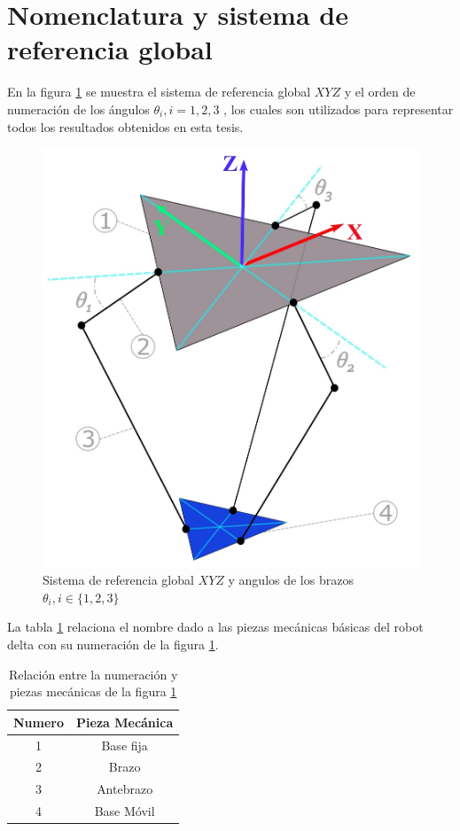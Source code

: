          \newpage


\section{Nomenclatura y sistema de referencia global}
    En la figura \ref{f:ref1} se muestra el sistema de referencia global $XYZ$ y el orden de numeración de los ángulos $\theta_i , i=1,2,3$ , los cuales son utilizados para representar todos los resultados obtenidos en esta tesis. 
    
        \begin{figure}[htb]
             \centering
             \includegraphics[width=0.73\linewidth]{Main/Chapter4/Images4/DIBUJO1.jpg}
              \caption{Sistema de referencia global $XYZ$ y angulos de los brazos $\theta_i , i\in \{1,2,3\}$ }
              \label{f:ref1}
        \end{figure}

La tabla \ref{tab:cap4_tabla_00} relaciona el nombre dado a las piezas mecánicas básicas del robot delta con su numeración de la figura \ref{f:ref1}.
        \begin{table}[h]
            \centering
            \begin{tabular}{c c}
            \hline
                \textbf{Numero}& \textbf{Pieza Mecánica} \\ 
            \hline             \hline
             1 & Base fija \\
            \hline
             2 & Brazo \\
            \hline
             3 & Antebrazo \\
            \hline
             4 & Base Móvil\\
            \hline
            \end{tabular}
           \caption{Relación entre la numeración y piezas mecánicas de la figura  \ref{f:ref1}}
           \label{tab:cap4_tabla_00}
        \end{table}
        

